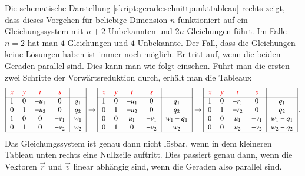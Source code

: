 Die schematische Darstellung 
\eqref{skript:gerade:schnittpunkttableau}
rechts zeigt, dass dieses Vorgehen für beliebige Dimension $n$
funktioniert auf ein Gleichungssystem mit $n+2$ Unbekannten und
$2n$ Gleichungen führt.
Im Falle $n=2$ hat man $4$ Gleichungen und $4$ Unbekannte.
Der Fall, dass die Gleichungen keine Lösungen haben ist immer noch
möglich.
Er tritt auf, wenn die beiden Geraden parallel sind.
Dies kann man wie folgt einsehen.
Führt man die ersten zwei Schritte der Vorwärtsreduktion durch,
erhält man die Tableaux
\[
\begin{tabular}{|>{$}c<{$}>{$}c<{$}>{$}c<{$}>{$}c<{$}|>{$}c<{$}|}
\hline
\color{red}x&\color{red}y&\color{red}t&\color{red}s&\\
\hline
1&0&-u_1&   0&q_1\\
0&1&-u_2&   0&q_2\\
1&0&   0&-v_1&w_1\\
0&1&   0&-v_2&w_2\\
\hline
\end{tabular}
\rightarrow
\begin{tabular}{|>{$}c<{$}>{$}c<{$}>{$}c<{$}>{$}c<{$}|>{$}c<{$}|}
\hline
\color{red}x&\color{red}y&\color{red}t&\color{red}s&\\
\hline
1&0&-u_1&   0&q_1\\
0&1&-u_2&   0&q_2\\
0&0& u_1&-v_1&w_1-q_1\\
0&1&   0&-v_2&w_2\\
\hline
\end{tabular}
\rightarrow
\begin{tabular}{|>{$}c<{$}>{$}c<{$}>{$}c<{$}>{$}c<{$}|>{$}c<{$}|}
\hline
\color{red}x&\color{red}y&\color{red}t&\color{red}s&\\
\hline
1&0&-r_1&   0&q_1\\
0&1&-r_2&   0&q_2\\
0&0& u_1&-v_1&w_1-q_1\\
0&0& u_2&-v_2&w_2-q_2\\
\hline
\end{tabular}\,.
\]
Das Gleichungssystem ist genau dann nicht lösbar, wenn in dem kleineren
Tableau unten rechts eine Nullzeile auftritt.
Dies passiert genau dann, wenn die Vektoren $\vec{r}$ und $\vec{v}$ 
linear abhängig sind, wenn die Geraden also parallel sind.

%
%
